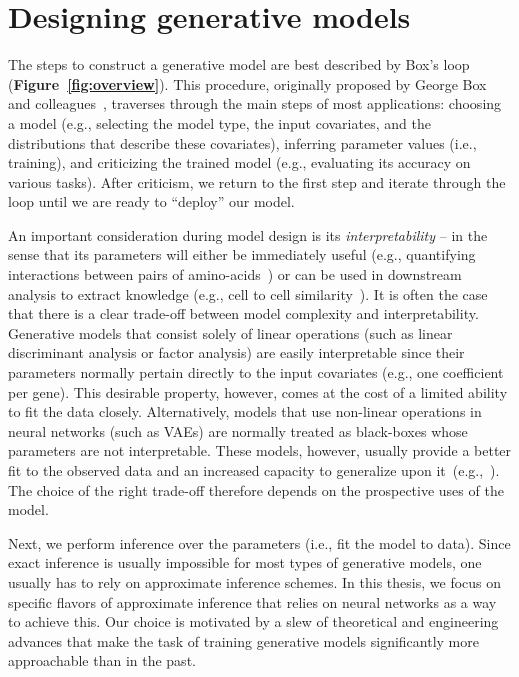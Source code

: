 \section{Designing generative models}
\label{subsec:design}
The steps to construct a generative model are best described by Box's loop~\cite{Blei2014} (\textbf{Figure~\ref{fig:overview}}). This procedure, originally proposed by George Box and colleagues~\cite{Box1976,Box1962}, traverses through the main steps of most applications: choosing a model (e.g., selecting the model type, the input covariates, and the distributions that describe these covariates), inferring parameter values (i.e., training), and criticizing the trained model (e.g., evaluating its accuracy on various tasks). After criticism, we return to the first step and iterate through the loop until we are ready to ``deploy'' our model.

An important consideration during model design is its \textit{interpretability} -- in the sense that its parameters will either be immediately useful (e.g., quantifying interactions between pairs of amino-acids~\cite{Riesselman2018}) or can be used in downstream analysis to extract knowledge (e.g., cell to cell similarity~\cite{Lopez2018}). It is often the case that there is a clear trade-off between model complexity and interpretability. Generative models that consist solely of linear operations (such as linear discriminant analysis or factor analysis) are easily interpretable since their parameters normally pertain directly to the input covariates (e.g., one coefficient per gene). This desirable property, however, comes at the cost of a limited ability to fit the data closely. Alternatively, models that use non-linear operations in neural networks (such as VAEs) are normally treated as black-boxes whose parameters are not interpretable. These models, however, usually provide a better fit to the observed data and an increased capacity to generalize upon it~(e.g.,~\cite{Riesselman2018}). The choice of the right trade-off therefore depends on the prospective uses of the model.

Next, we perform inference over the parameters (i.e., fit the model to data). Since exact inference is usually impossible for most types of generative models, one usually has to rely on approximate inference schemes. In this thesis, we focus on specific flavors of approximate inference that relies on neural networks as a way to achieve this. Our choice is motivated by a slew of theoretical and engineering advances that make the task of training generative models significantly more approachable than in the past.



